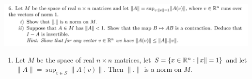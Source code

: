 \documentclass[12pt]{article}
\begin{document}
\newpage
\begin{mdframed}
  \includegraphics[width=400pt]{img/oxford-a2-2-6.png}
\end{mdframed}
\begin{enumerate}[label=(\roman*)]
\item
  \begin{claim*}
    Let $M$ be the space of real $n \times n$ matrices, let $S = \{x \in \mathbb{R}^n : \|x\| = 1\}$ and
    let $\|A\| = \sup_{v \in S} \|A(v)\|$. Then $\|.\|$ is a norm on $M$.
  \end{claim*}


\end{enumerate}
\end{document}
